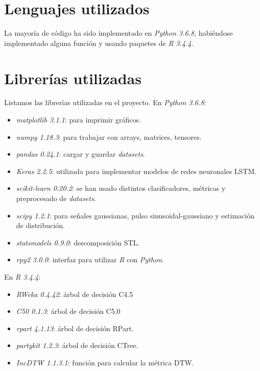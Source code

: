 \section{Lenguajes utilizados}

La mayoría de código ha sido implementado en \emph{Python 3.6.8}, habiéndose implementado alguna función y usando paquetes de \emph{R 3.4.4}.

\section{Librerías utilizadas}

Listamos las librerías utilizadas en el proyecto. En \emph{Python 3.6.8}:

\begin{itemize}
  \item \emph{matplotlib 3.1.1}: para imprimir gráficos.
  \item \emph{numpy 1.18.3}: para trabajar con arrays, matrices, tensores.
  \item \emph{pandas 0.24.1}: cargar y guardar \emph{datasets}.
  \item \emph{Keras 2.2.5}: utilizada para implementar modelos de redes neuronales LSTM.
  \item \emph{scikit-learn 0.20.2}: se han usado distintos clasificadores, métricas y preprocesado de \emph{datasets}.
  \item \emph{scipy 1.2.1}: para señales gaussianas, pulso sinusoidal-gaussiano y estimación de distribución.
  \item \emph{statsmodels 0.9.0}: descomposición STL.
  \item \emph{rpy2 3.0.0}: interfaz para utilizar \emph{R} con \emph{Python}.
\end{itemize}

En \emph{R 3.4.4}:

\begin{itemize}
  \item \emph{RWeka 0.4.42}: árbol de decisión C4.5
  \item \emph{C50 0.1.3}: árbol de decisión C5.0
  \item \emph{rpart 4.1.13}: árbol de decisión RPart.
  \item \emph{partykit 1.2.3}: árbol de decisión CTree.
  \item \emph{IncDTW 1.1.3.1}: función para calcular la métrica DTW.
\end{itemize}

\endinput
